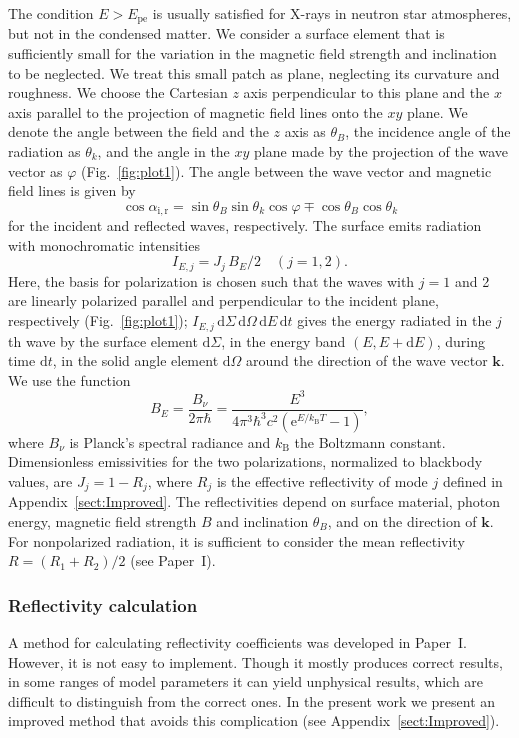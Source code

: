 \documentclass{aa}
\newcommand{\beq}{\begin{equation}}
\newcommand{\eeq}{\end{equation}}
\newcommand{\dd}{\mathrm{d}} %
\newcommand{\Epe}{E_\mathrm{pe}}
\newcommand{\kB}{k_\mathrm{B}}
\begin{document}
The condition $E > \Epe$ is usually satisfied for X-rays
in neutron star atmospheres, but not in the
condensed matter. We consider a 
surface element that is sufficiently small for the variation
in the magnetic field strength and inclination to be neglected.
We treat this small patch as plane, neglecting
its curvature and roughness. We choose
the Cartesian $z$ axis perpendicular to this plane
and the $x$ axis parallel to the projection of
magnetic field lines onto the $xy$ plane. We denote
the angle between the field and the $z$ axis as $\theta_B$,
the incidence angle of the radiation as $\theta_k$, and the 
angle in the $xy$ plane made by the projection of the 
wave vector as $\varphi$ (Fig.~\ref{fig:plot1}). 
The
angle between the wave vector and magnetic field lines is
given by
\beq
   \cos\alpha_\mathrm{i,r} =
     \sin\theta_B \sin\theta_k  \cos\varphi
      \mp 
     \cos\theta_B \cos\theta_k
\label{alpha}
\eeq
for the incident and reflected waves, respectively.
The surface emits radiation 
with monochromatic intensities
\beq
I_{E, j}= J_j\,B_E / 2
\quad
(j=1,2).
\eeq
Here, the basis for polarization is chosen such that 
the waves with $j=1$ and 2 are linearly polarized parallel 
and perpendicular to the incident plane, respectively 
(Fig.~\ref{fig:plot1});
$I_{E, j}\,\dd\Sigma\,\dd\Omega\,\dd E\, \dd t$ gives the
energy radiated in the $j$th wave by the surface element
$\dd\Sigma$, in the energy band $(E,E+\dd E)$, during time
$\dd t$, in the solid angle element $\dd\Omega$ around the
direction of the wave vector $\bm{k}$.  We use the function  
\beq
   B_E = \frac{B_\nu}{2\pi\hbar}=
   \frac{E^3}{4\pi^3\hbar^3c^2(\mathrm{e}^{E/\kB T}-1)},
\eeq
where $B_\nu$ is Planck's spectral radiance and $\kB$
the Boltzmann constant. Dimensionless emissivities for
the two polarizations, normalized to blackbody values,
are $J_j = 1-R_j$, where $R_j$ is the effective
reflectivity of mode $j$ defined in Appendix~\ref{sect:Improved}. 
The reflectivities depend on surface material, photon energy, 
magnetic field strength $B$ and inclination $\theta_B$, and on 
the direction of $\bm{k}$.  For nonpolarized radiation, it is
sufficient to consider the mean reflectivity
$
   R = (R_1+R_2)/{2}
$
(see Paper~I).

\subsubsection{Reflectivity calculation}
\label{sect:reflGen}

A method for calculating reflectivity coefficients was
developed in Paper~I. However, it is not easy to implement.
Though it mostly produces correct results, in some ranges of model
parameters it can yield unphysical results, which are
difficult to distinguish from the correct ones. In the
present work we present an improved method that
avoids this complication (see Appendix~\ref{sect:Improved}).
\end{document}
